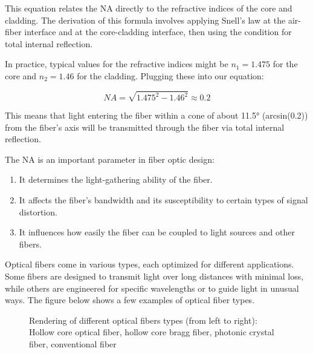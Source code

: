 \documentclass[
  a4paper,
]{book}
\providecommand{\tightlist}{%
  \setlength{\itemsep}{0pt}\setlength{\parskip}{0pt}}
\begin{document}
This equation relates the NA directly to the refractive indices of the
core and cladding. The derivation of this formula involves applying
Snell's law at the air-fiber interface and at the core-cladding
interface, then using the condition for total internal reflection.

In practice, typical values for the refractive indices might be
\(n_1 = 1.475\) for the core and \(n_2 = 1.46\) for the cladding.
Plugging these into our equation:

\begin{equation}
NA = \sqrt{1.475^2 - 1.46^2} \approx 0.2
\end{equation}

This means that light entering the fiber within a cone of about 11.5°
(arcsin(0.2)) from the fiber's axis will be transmitted through the
fiber via total internal reflection.

The NA is an important parameter in fiber optic design:

\begin{enumerate}
\def\labelenumi{\arabic{enumi}.}
\tightlist
\item
  It determines the light-gathering ability of the fiber.
\item
  It affects the fiber's bandwidth and its susceptibility to certain
  types of signal distortion.
\item
  It influences how easily the fiber can be coupled to light sources and
  other fibers.
\end{enumerate}

Optical fibers come in various types, each optimized for different
applications. Some fibers are designed to transmit light over long
distances with minimal loss, while others are engineered for specific
wavelengths or to guide light in unusual ways. The figure below shows a
few examples of optical fiber types.

\begin{figure}


\caption{\label{fig-optical-fiber}Rendering of different optical fibers
types (from left to right): Hollow core optical fiber, hollow core bragg
fiber, photonic crystal fiber, conventional fiber}

\end{figure}%
\end{document}
